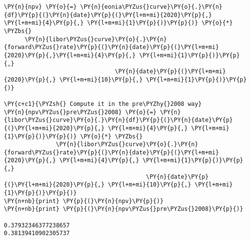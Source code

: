 \begin{Answer}
\begin{tcolorbox}[size=fbox, boxrule=1pt, pad at break*=1mm,colback=cellbackground, colframe=cellborder]
\begin{Verbatim}[commandchars=\\\{\}]
\PY{n}{npv} \PY{o}{=} \PY{n}{eonia\PYZus{}curve}\PY{o}{.}\PY{n}{df}\PY{p}{(}\PY{n}{date}\PY{p}{(}\PY{l+m+mi}{2020}\PY{p}{,} \PY{l+m+mi}{4}\PY{p}{,} \PY{l+m+mi}{1}\PY{p}{)}\PY{p}{)} \PY{o}{*} \PYZbs{}
      \PY{n}{libor\PYZus{}curve}\PY{o}{.}\PY{n}{forward\PYZus{}rate}\PY{p}{(}\PY{n}{date}\PY{p}{(}\PY{l+m+mi}{2020}\PY{p}{,}\PY{l+m+mi}{4}\PY{p}{,} \PY{l+m+mi}{1}\PY{p}{)}\PY{p}{,} 
                                \PY{n}{date}\PY{p}{(}\PY{l+m+mi}{2020}\PY{p}{,} \PY{l+m+mi}{10}\PY{p}{,} \PY{l+m+mi}{1}\PY{p}{)}\PY{p}{)}

\PY{c+c1}{\PYZsh{} Compute it in the pre\PYZhy{}2008 way}
\PY{n}{npv\PYZus{}pre\PYZus{}2008} \PY{o}{=} \PY{n}{libor\PYZus{}curve}\PY{o}{.}\PY{n}{df}\PY{p}{(}\PY{n}{date}\PY{p}{(}\PY{l+m+mi}{2020}\PY{p}{,} \PY{l+m+mi}{4}\PY{p}{,} \PY{l+m+mi}{1}\PY{p}{)}\PY{p}{)} \PY{o}{*} \PYZbs{}
               \PY{n}{libor\PYZus{}curve}\PY{o}{.}\PY{n}{forward\PYZus{}rate}\PY{p}{(}\PY{n}{date}\PY{p}{(}\PY{l+m+mi}{2020}\PY{p}{,} \PY{l+m+mi}{4}\PY{p}{,} \PY{l+m+mi}{1}\PY{p}{)}\PY{p}{,} 
                                         \PY{n}{date}\PY{p}{(}\PY{l+m+mi}{2020}\PY{p}{,} \PY{l+m+mi}{10}\PY{p}{,} \PY{l+m+mi}{1}\PY{p}{)}\PY{p}{)}
\PY{n+nb}{print} \PY{p}{(}\PY{n}{npv}\PY{p}{)}
\PY{n+nb}{print} \PY{p}{(}\PY{n}{npv\PYZus{}pre\PYZus{}2008}\PY{p}{)}

0.37932346377238657
0.38139410902305737
\end{Verbatim}
\end{tcolorbox}
\end{Answer}




  
